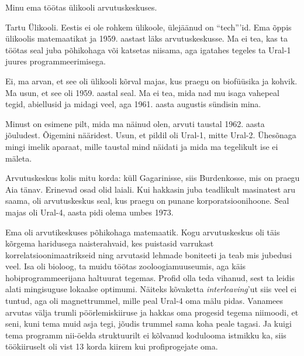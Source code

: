 

Minu ema töötas ülikooli arvutuskeskuses.


Tartu Ülikooli. Eestis ei ole rohkem ülikoole, ülejäänud on 
\enquote{tech}'id. Ema õppis ülikoolis matemaatikat ja 1959. aastast läks 
arvutuskeskusse. Ma ei tea, kas ta töötas seal juba põhikohaga või 
katsetas niisama, aga igatahes tegeles ta Ural-1 juures 
programmeerimisega. 

Ei, ma arvan, et see oli ülikooli kõrval majas, kus praegu on biofüüsika ja 
kohvik. Ma usun, et see oli 1959. aastal seal. Ma ei tea, mida nad mu 
isaga vahepeal tegid, abiellusid ja midagi veel, aga 1961. aasta augustis 
sündisin mina. 

Minust on esimene pilt, mida ma näinud olen, arvuti taustal 1962. aasta 
jõuludest. Õigemini nääridest. Usun, et pildil oli Ural-1, mitte Ural-2. 
Ühesõnaga mingi imelik aparaat, mille taustal mind näidati ja mida ma 
tegelikult ise ei mäleta. 

Arvutuskeskus kolis mitu korda: küll Gagarinisse, siis Burdenkosse, mis 
on praegu Aia tänav. Erinevad osad olid laiali. Kui hakkasin 
juba teadlikult masinatest aru saama, oli arvutuskeskus seal, kus praegu on 
punane korporatsioonihoone. Seal majas oli Ural-4, aasta pidi olema umbes 1973. 


Ema oli arvutikeskuses põhikohaga matemaatik. Kogu arvutuskeskus oli täis
kõrgema haridusega naisterahvaid, kes puistasid varrukast 
korrelatsioonimaatrikseid ning arvutasid lehmade boniteeti ja teab mis 
jubedusi veel. Isa oli bioloog, 
ta muidu töötas zooloogiamuuseumis, aga käis hobiprogrammeerijana haltuurat tegemas. Profid olla teda vihanud, sest ta leidis alati 
mingisuguse lokaalse optimumi. Näiteks kõvaketta \emph{interleaving}'ut siis 
veel ei tuntud, aga oli magnettrummel, mille peal Ural-4 oma mälu pidas. 
Vanamees arvutas välja trumli pöörlemiskiiruse ja hakkas oma 
progesid tegema niimoodi, et seni, kuni tema muid asja tegi, jõudis trummel sama koha peale tagasi. Ja kuigi tema programm nii-öelda 
struktuurilt ei kõlvanud kodulooma istmikku ka, siis töökiiruselt oli vist 
13 korda kiirem kui profiprogejate oma.


